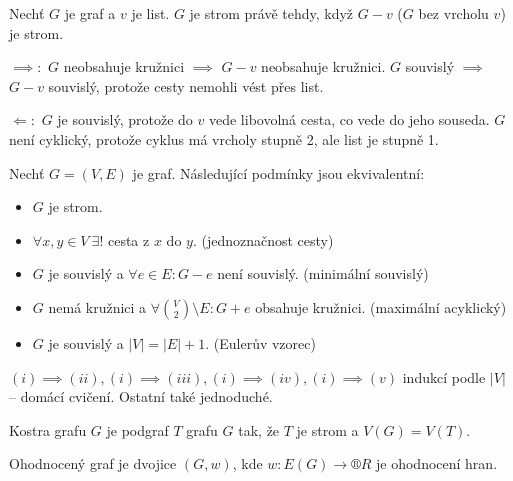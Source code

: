 \documentclass[12pt]{article}					%
\begin{document}
    \begin{veta}
        Nechť $G$ je graf a $v$ je list. $G$ je strom právě tehdy, když $G-v$ ($G$ bez vrcholu $v$) je strom.

        \begin{dukazin}
            $\implies:$ $G$ neobsahuje kružnici $\implies$ $G-v$ neobsahuje kružnici. $G$ souvislý $\implies$ $G-v$ souvislý, protože cesty nemohli vést přes list.

            $\Leftarrow:$ $G$ je souvislý, protože do $v$ vede libovolná cesta, co vede do jeho souseda. $G$ není cyklický, protože cyklus má vrcholy stupně 2, ale list je stupně 1.
        \end{dukazin}
    \end{veta}

    \begin{veta}
        Nechť $G=(V, E)$ je graf. Následující podmínky jsou ekvivalentní:

        \begin{itemize}
            \item $G$ je strom.
            \item $\forall x, y \in V\ \exists!$ cesta z $x$ do $y$. (jednoznačnost cesty)
            \item $G$ je souvislý a $\forall e\in E: G-e$ není souvislý. (minimální souvislý)
            \item $G$ nemá kružnici a $\forall \binom{V}{2} \setminus E: G+e$ obsahuje kružnici. (maximální acyklický)
            \item $G$ je souvislý a $|V| = |E| + 1$. (Eulerův vzorec)
        \end{itemize}

        \begin{dukazin}
            $(i) \implies (ii), (i) \implies (iii), (i) \implies (iv), (i) \implies (v)$ indukcí podle $|V|$ -- domácí cvičení. Ostatní také jednoduché.
        \end{dukazin}
    \end{veta}


    \begin{definice}[Kostra]
        Kostra grafu $G$ je podgraf $T$ grafu $G$ tak, že $T$ je strom a $V(G) = V(T)$.
    \end{definice}

    \begin{definice}
        Ohodnocený graf je dvojice $(G, w)$, kde $w: E(G) \rightarrow ®R$ je ohodnocení hran.
    \end{definice}
\end{document}
